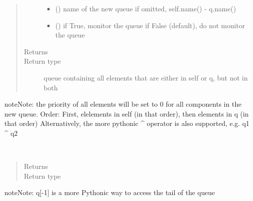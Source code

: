 \documentclass[letterpaper,10pt,english]{sphinxmanual}
\begin{document}
\begin{fulllineitems}
\begin{fulllineitems}
\begin{quote}
\begin{description}
\begin{itemize}
\item {} 
 () \textendash{} name of the  new queue 
if omitted, self.name() - q.name()

\item {} 
 () \textendash{} if True, monitor the queue 
if False (default), do not monitor the queue

\end{itemize}

\item[{Returns}] \leavevmode


\item[{Return type}] \leavevmode
queue containing all elements that are either in self or q, but not in both

\end{description}\end{quote}

\begin{sphinxadmonition}{note}{Note:}
the priority of all elements will be set to 0 for all components in the new queue.
Order: First, elelements in self (in that order), then elements in q (in that order)
Alternatively, the more pythonic \textasciicircum{} operator is also supported, e.g. q1 \textasciicircum{} q2
\end{sphinxadmonition}

\end{fulllineitems}


\begin{fulllineitems}
\label{\detokenize{Reference:salabim.Queue.tail}}~\begin{quote}\begin{description}
\item[{Returns}] \leavevmode
{}

\item[{Return type}] \leavevmode
{\hyperref[\detokenize{Reference:salabim.Component}]{}}

\end{description}\end{quote}

\begin{sphinxadmonition}{note}{Note:}
q{[}-1{]} is a more Pythonic way to access the tail of the queue
\end{sphinxadmonition}


\end{fulllineitems}
\end{fulllineitems}
\end{document}
